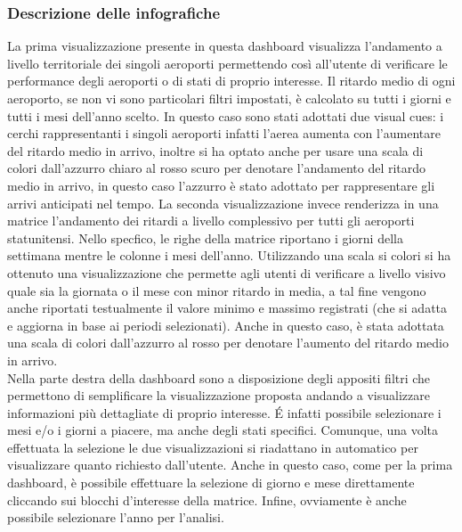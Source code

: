 \documentclass[12pt]{article}
\begin{document}
\subsubsection{Descrizione delle infografiche}
La prima visualizzazione presente in questa dashboard visualizza l'andamento a livello territoriale dei singoli aeroporti permettendo così all'utente di verificare le performance degli aeroporti o di stati di proprio interesse. Il ritardo medio di ogni aeroporto, se non vi sono particolari filtri impostati, è calcolato su tutti i giorni e tutti i mesi dell'anno scelto. In questo caso sono stati adottati due visual cues: i cerchi rappresentanti i singoli aeroporti infatti l'aerea aumenta con l'aumentare del ritardo medio in arrivo, inoltre si ha optato anche per usare una scala di colori dall'azzurro chiaro al rosso scuro per denotare l'andamento del ritardo medio in arrivo, in questo caso l'azzurro è stato adottato per rappresentare gli arrivi anticipati nel tempo.
La seconda visualizzazione invece renderizza in una matrice l'andamento dei ritardi a livello complessivo per tutti gli aeroporti statunitensi. Nello specfico, le righe della matrice riportano i giorni della settimana mentre le colonne i mesi dell'anno. Utilizzando una scala si colori si ha ottenuto una visualizzazione che permette agli utenti di verificare a livello visivo quale sia la giornata o il mese con minor ritardo in media, a tal fine vengono anche riportati testualmente il valore minimo e massimo registrati (che si adatta e aggiorna in base ai periodi selezionati). Anche in questo caso, è stata adottata una scala di colori dall'azzurro al rosso per denotare l'aumento del ritardo medio in arrivo.\\
Nella parte destra della dashboard sono a disposizione degli appositi filtri che permettono di semplificare la visualizzazione proposta andando a visualizzare informazioni più dettagliate di proprio interesse. \'E infatti possibile selezionare i mesi e/o i giorni a piacere, ma anche degli stati specifici. Comunque, una volta effettuata la selezione le due visualizzazioni si riadattano in automatico per visualizzare quanto richiesto dall'utente. Anche in questo caso, come per la prima dashboard, è possibile effettuare la selezione di giorno e mese direttamente cliccando sui blocchi d'interesse della matrice. Infine, ovviamente è anche possibile selezionare l'anno per l'analisi.
\end{document}
